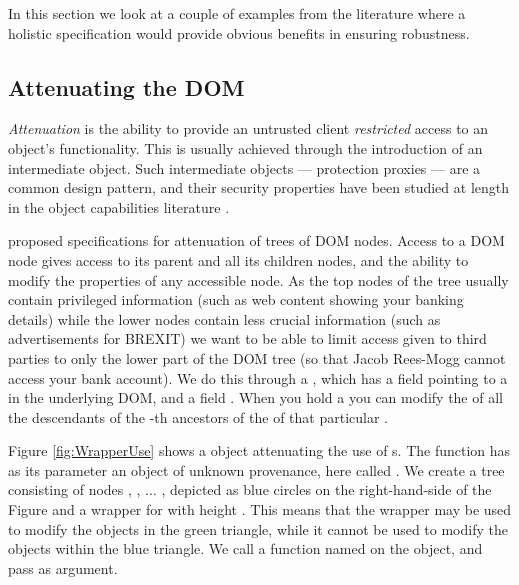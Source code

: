 In this section we look at a couple of examples from the literature where a holistic specification would provide obvious benefits in ensuring robustness.
\subsection{Attenuating the DOM}
\label{sect:example:DOM}

\emph{Attenuation} is the ability to provide an untrusted client \emph{restricted}  access to an object's functionality. This is usually achieved through the introduction of an intermediate object. Such intermediate objects --- protection proxies \cite{gof} --- are a common design pattern, and their security properties have been studied at length in the object capabilities literature \cite{MillerPhD,murray10-infoflow}.

\citet{dd} proposed specifications for attenuation of trees of DOM  nodes.
Access to a DOM node
gives access to its parent and all its children nodes, and the ability to
modify the properties of any accessible node. As the top nodes of the
tree usually contain privileged information (such as web content
showing your banking details) while the lower nodes contain less
crucial information (such as advertisements for BREXIT) we want to be
able to limit access given to third parties to only the lower part of
the DOM tree (so that Jacob Rees-Mogg cannot access your bank
account). We do this through a , which has
a field  pointing to a  in the underlying DOM, and a field .
When you hold
a  you can modify the  of all the
descendants of the -th ancestors of the  of that
particular . 


Figure \ref{fig:WrapperUse} shows a
 object attenuating the use of 
s.
The
function  has as its parameter an object of unknown
provenance, here called . We create a tree
consisting of nodes , , ... , depicted as blue
circles on the right-hand-side of the Figure and a
wrapper for  with height . This means that the
wrapper  may be used to modify
 the objects in the green triangle, while it cannot be used to
modify the objects within the
blue triangle.  We call a function named  on
the  object, and pass  as argument.

